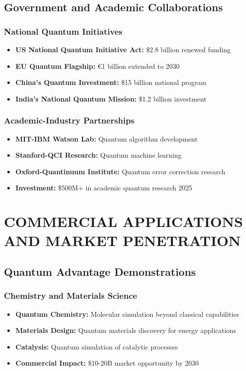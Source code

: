 \documentclass[12pt,a4paper]{article}
\begin{document}
\subsection{Government and Academic Collaborations}

\subsubsection{National Quantum Initiatives}
\begin{itemize}
    \item \textbf{US National Quantum Initiative Act:} \$2.8 billion renewed funding
    \item \textbf{EU Quantum Flagship:} €1 billion extended to 2030
    \item \textbf{China's Quantum Investment:} \$15 billion national program
    \item \textbf{India's National Quantum Mission:} \$1.2 billion investment
\end{itemize}

\subsubsection{Academic-Industry Partnerships}
\begin{itemize}
    \item \textbf{MIT-IBM Watson Lab:} Quantum algorithm development
    \item \textbf{Stanford-QCI Research:} Quantum machine learning
    \item \textbf{Oxford-Quantinuum Institute:} Quantum error correction research
    \item \textbf{Investment:} \$500M+ in academic quantum research 2025
\end{itemize}

\section{COMMERCIAL APPLICATIONS AND MARKET PENETRATION}

\subsection{Quantum Advantage Demonstrations}

\subsubsection{Chemistry and Materials Science}
\begin{itemize}
    \item \textbf{Quantum Chemistry:} Molecular simulation beyond classical capabilities
    \item \textbf{Materials Design:} Quantum materials discovery for energy applications
    \item \textbf{Catalysis:} Quantum simulation of catalytic processes
    \item \textbf{Commercial Impact:} \$10-20B market opportunity by 2030
\end{itemize}
\end{document}
